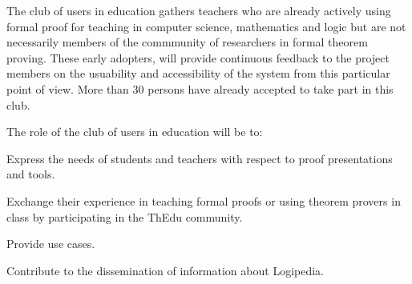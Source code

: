 \begin{workpackage}[id=dissemination,type=MGT,wphases=1-48,
  short={Dissemination},
  title={Dissemination, communication and exploitation},
  lead=Lie,LieRM=1,InrRM=6,BirRM=4,CleRM=2,ImtRM=2,StrRM=2,ZibRM=14,EduRM=12]
\begin{tasklist}
  \begin{task}[id=teachers-club,
      title=Expanding the use of Logipedia in education,
      shorttitle=Educ.,
      lead=Str,StrRM=2,wphases=1-48!.05]
    The club of users in education gathers
    teachers who are already actively using formal proof for teaching
    in computer science, mathematics and logic but are not necessarily
    members of the commmunity of researchers in formal theorem
    proving. These early adopters, will provide continuous feedback to
    the project members on the usuability and accessibility of the
    system from this particular point of view.  More than 30 persons
    have already accepted to take part in this club.



    The role of the club of users in education will be to:
    \begin{compactitem}
    \item Express the needs of students and teachers with respect to proof
      presentations and tools.
    \item Exchange their experience in teaching formal proofs or using
      theorem provers in class by participating in the ThEdu community.
    \item Provide use cases.
    \item Contribute to the dissemination of information about Logipedia.
    \end{compactitem}


\end{task}
\end{tasklist}
\end{workpackage}
